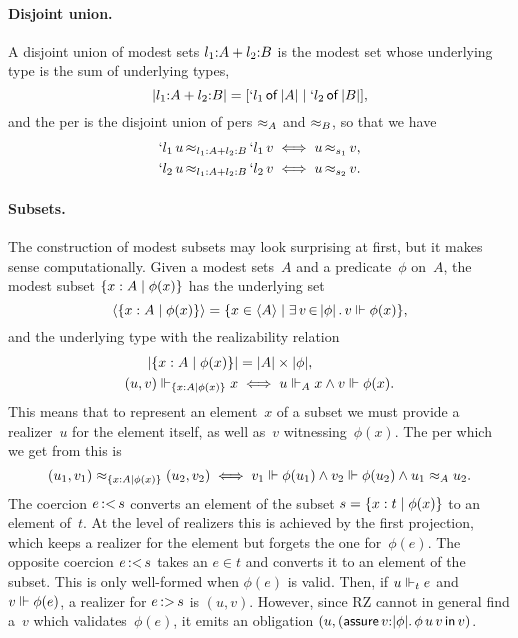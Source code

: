 \paragraph{Disjoint union.}
%
A disjoint union of modest sets $\isum{\il_1}{A}{\il_2}{B}$ is the
modest set whose underlying type is the sum of underlying types,
%
\begin{equation*}
  \typeOf{\isum{\il_1}{A}{\il_2}{B}} =
  \osumtyx{\il_1}{\typeOf{A}}{\il_2}{\typeOf{B}},
\end{equation*}
%
and the per is the disjoint union of pers $\per_{A}$ and $\per_{B}$, so
that we have
%
\begin{align*}
  \oper{\isum{\il_1}{A}{\il_2}{B}}{\oinj{\il_1}{u}}{\oinj{\il_1}{v}}
  &\iff \oper{s_1}{u}{v},
  \\
  \oper{\isum{\il_1}{A}{\il_2}{B}}{\oinj{\il_2}{u}}{\oinj{\il_2}{v}}
  &\iff \oper{s_2}{u}{v}.
\end{align*}
%

\paragraph{Subsets.}
%
The construction of modest subsets may look surprising at first, but
it makes sense computationally. Given a modest sets~$A$ and a
predicate~$\phi$ on~$A$, the modest subset $\set{x : A \such \phi(x)}$
has the underlying set
%
\begin{equation*}
  \setOf{\set{x : A \such \phi(x)}} =
  \set{x \in \setOf{A} \such \xsome{v}{\typeOf{\phi}}{v \rz \phi(x)}},
\end{equation*}
%
and the underlying type with the realizability relation
%
\begin{align*}
  \typeOf{\set{x : A \such \phi(x)}} &= \typeOf{A} \times
  \typeOf{\phi},\\
  (u,v) \rz_{\set{x : A \such \phi(x)}} x &\iff
  u \rz_A x \land v \rz \phi(x).
\end{align*}
%
This means that to represent an element~$x$ of a subset we must
provide a realizer~$u$ for the element itself, as well as~$v$
witnessing~$\phi(x)$. The per which we get from this is
%
\begin{equation*}
  (u_1, v_1) \per_{\set{x : A \such \phi(x)}} (u_2, v_2) \iff
  v_1 \rz \phi(u_1) \land v_2 \rz \phi(u_2) \land
  u_1 \per_A u_2.
\end{equation*}
%
The coercion $\isubout{e}{s}$ converts an element of the subset $s =
\set{x : t \such \phi(x)}$ to an element of~$t$. At the level of
realizers this is achieved by the first projection, which keeps a
realizer for the element but forgets the one for~$\phi(e)$. The
opposite coercion $\isubout{e}{s}$ takes an $e \in t$ and converts it
to an element of the subset. This is only well-formed when $\phi(e)$
is valid. Then, if $u \rz_t e$ and $v \rz \phi(e)$, a realizer for
$\isubin{e}{s}$ is $(u, v)$. However, since RZ cannot in general find
a~$v$ which validates~$\phi(e)$, it emits an obligation $(u,
(\ooblig{v}{\typeOf{\phi}}{\oapp{\oapp{\phi}{u}}{v}}{v})$.

